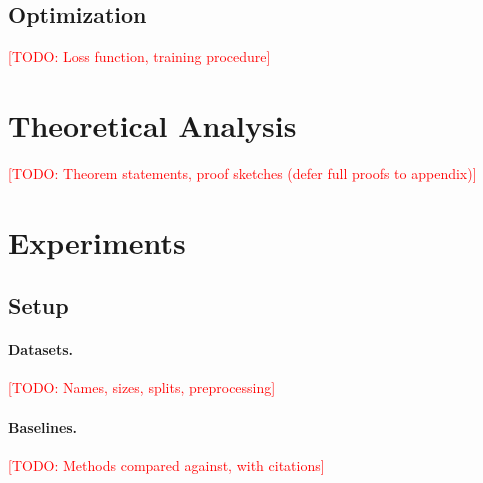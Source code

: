 \documentclass[11pt,a4paper]{article}
\newcommand{\ours}{\textsc{<MethodName>}}
\newcommand{\todo}[1]{\textcolor{red}{[TODO: #1]}}
\begin{document}
\subsection{Optimization}
\label{sec:optimization}
\todo{Loss function, training procedure}


\section{Theoretical Analysis}
\label{sec:theory}

\todo{Theorem statements, proof sketches (defer full proofs to appendix)}

\section{Experiments}
\label{sec:experiments}

\subsection{Setup}
\label{sec:setup}

\paragraph{Datasets.}
\todo{Names, sizes, splits, preprocessing}

\paragraph{Baselines.}
\todo{Methods compared against, with citations}
\end{document}
